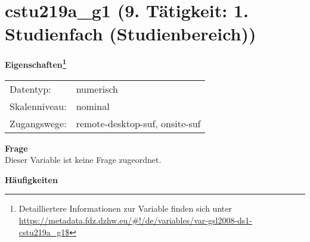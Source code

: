 
    \setcounter{footnote}{0}

    \vspace*{-1.8cm}
	\section{cstu219a\_g1 (9. Tätigkeit: 1. Studienfach (Studienbereich))}
	\label{section:cstu219a_g1}



    \vspace*{0.5cm}
    \noindent\textbf{Eigenschaften\footnote{Detailliertere Informationen zur Variable finden sich unter
		\url{https://metadata.fdz.dzhw.eu/\#!/de/variables/var-gsl2008-ds1-cstu219a_g1$}}}\\
	\begin{tabularx}{\hsize}{@{}lX}
	Datentyp: & numerisch \\
	Skalenniveau: & nominal \\
	Zugangswege: &
	  remote-desktop-suf, 
	  onsite-suf
 \\
    \end{tabularx}



		\vspace*{0.5cm}
		\noindent\textbf{Frage}\\
		Dieser Variable ist keine Frage zugeordnet.





        		\vspace*{0.5cm}
                \noindent\textbf{Häufigkeiten}

